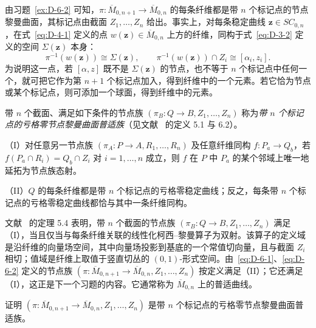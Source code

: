 由习题~\ref{ex:D-6-2} 可知，$\pi:\overline M_{0,n+1}\to\overline M_{0,n}$ 的每条纤维都是带 $n$ 个标记点的节点黎曼曲面，其标记点由截面 $Z_1,\ldots,Z_n$ 给出。事实上，对每条稳定曲线 $\mathbf z\in SC_{0,n}$，在式~\eqref{eq:D-4-1} 定义的点 $w(\mathbf z)\in\overline M_{0,n}$ 上方的纤维，同构于式~\eqref{eq:D-3-2} 定义的空间 $\Sigma(\mathbf z)$ 本身：
\begin{equation}\label{eq:D-6-4}
  \pi^{-1}(w(\mathbf z))\cong\Sigma(\mathbf z),\qquad
  \pi^{-1}(w(\mathbf z))\cap Z_i\cong[\alpha_i,z_i].
\end{equation}
为说明这一点，若 $[\alpha,z]$ 既不是 $\Sigma(\mathbf z)$ 的节点，也不等于 $n$ 个标记点中任何一个，就可把它作为第 $n+1$ 个标记点加入，得到纤维中的一个元素。若它恰为节点或某个标记点，则可添加一个球面，得到纤维中的元素。

带 $n$ 个截面、满足如下条件的节点族 $(\pi_B:Q\to B,Z_1,\ldots,Z_n)$ 称为\emph{带 $n$ 个标记点的亏格零节点黎曼曲面普适族}（见文献~ 的定义 5.1 与 6.2）。

\noindent\textup{（I）}对任意另一节点族 $(\pi_A:P\to A,R_1,\ldots,R_n)$ 及任意纤维同构 $f:P_a\to Q_b$，若 $f(P_a\cap R_i)=Q_b\cap Z_i$ 对 $i=1,\ldots,n$ 成立，则 $f$ 在 $P$ 中 $P_a$ 的某个邻域上唯一地延拓为节点族态射。

\noindent\textup{（II）}$Q$ 的每条纤维都是带 $n$ 个标记点的亏格零稳定曲线；反之，每条带 $n$ 个标记点的亏格零稳定曲线都恰与其中一条纤维同构。

文献~ 的定理 5.4 表明，带 $n$ 个截面的节点族 $(\pi_B:Q\to B,Z_1,\ldots,Z_n)$ 满足（I），当且仅当与每条纤维关联的线性化柯西--黎曼算子为双射。该算子的定义域是沿纤维的向量场空间，其中向量场投影到基底的一个常值切向量，且与截面 $Z_i$ 相切；值域是纤维上取值于竖直切丛的 $(0,1)$-形式空间。由~\eqref{eq:D-6-1}、\eqref{eq:D-6-2} 定义的节点族 $(\pi:\overline M_{0,n+1}\to\overline M_{0,n},Z_1,\ldots,Z_n)$ 按定义满足（II）；它还满足（I），这正是下一个习题的内容。它通常称为 $\overline M_{0,n}$ 上的普适曲线。

\begin{exercise}\label{ex:D-6-3}
证明 $(\pi:\overline M_{0,n+1}\to\overline M_{0,n},Z_1,\ldots,Z_n)$ 是带 $n$ 个标记点的亏格零节点黎曼曲面普适族。
\end{exercise}

